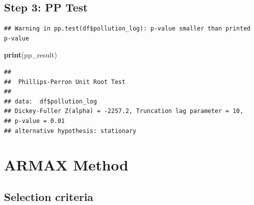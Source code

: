 \documentclass[
]{article}
\newenvironment{Shaded}{\begin{snugshade}}{\end{snugshade}}
\newcommand{\AttributeTok}[1]{\textcolor[rgb]{0.13,0.29,0.53}{#1}}
\newcommand{\DecValTok}[1]{\textcolor[rgb]{0.00,0.00,0.81}{#1}}
\newcommand{\FunctionTok}[1]{\textcolor[rgb]{0.13,0.29,0.53}{\textbf{#1}}}
\newcommand{\NormalTok}[1]{#1}
\newcommand{\OtherTok}[1]{\textcolor[rgb]{0.56,0.35,0.01}{#1}}
\newcommand{\SpecialCharTok}[1]{\textcolor[rgb]{0.81,0.36,0.00}{\textbf{#1}}}
\newcommand{\StringTok}[1]{\textcolor[rgb]{0.31,0.60,0.02}{#1}}
\begin{document}
\subsection{Step 3: PP Test}\label{step-3-pp-test}

\begin{Shaded}
\end{Shaded}

\begin{verbatim}
## Warning in pp.test(df$pollution_log): p-value smaller than printed p-value
\end{verbatim}

\begin{Shaded}
\begin{Highlighting}[]
\FunctionTok{print}\NormalTok{(pp\_result)}
\end{Highlighting}
\end{Shaded}

\begin{verbatim}
## 
##  Phillips-Perron Unit Root Test
## 
## data:  df$pollution_log
## Dickey-Fuller Z(alpha) = -2257.2, Truncation lag parameter = 10,
## p-value = 0.01
## alternative hypothesis: stationary
\end{verbatim}

\section{ARMAX Method}\label{armax-method}

\subsection{Selection criteria}\label{selection-criteria}

\begin{Shaded}
\end{Shaded}
\end{document}
